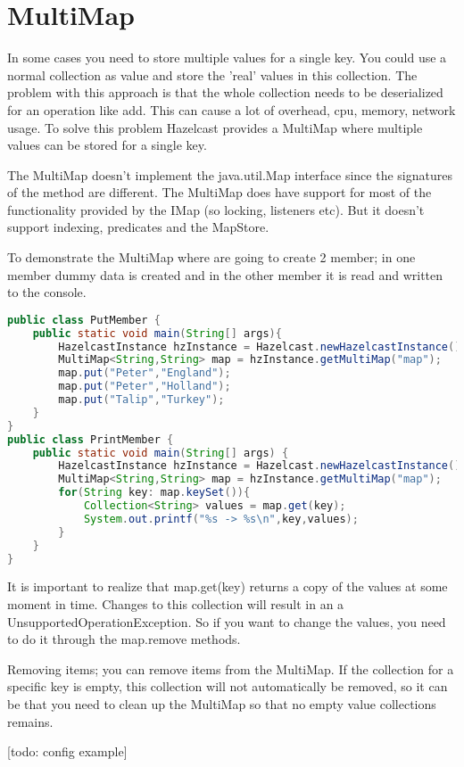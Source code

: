 \section{MultiMap}
In some cases you need to store multiple values for a single key. You could use a normal collection as value and store the 'real' values in this collection. The problem with this approach is that the whole collection needs to be deserialized for an operation like add. This can cause a lot of overhead, cpu, memory, network usage. To solve this problem Hazelcast provides a MultiMap where multiple values can be stored for a single key. 

The MultiMap doesn't implement the java.util.Map interface since the signatures of the method are different. The MultiMap does have support for most of the functionality provided by the IMap (so locking, listeners etc). But it doesn't support indexing, predicates and the MapStore.

To demonstrate the MultiMap where are going to create 2 member; in one member dummy data is created and in the other member it is read and written to the console.
\begin{lstlisting}[language=java]
public class PutMember {
    public static void main(String[] args){
        HazelcastInstance hzInstance = Hazelcast.newHazelcastInstance();
        MultiMap<String,String> map = hzInstance.getMultiMap("map");
        map.put("Peter","England");
        map.put("Peter","Holland");
        map.put("Talip","Turkey");
    }
}
public class PrintMember {
    public static void main(String[] args) {
        HazelcastInstance hzInstance = Hazelcast.newHazelcastInstance();
        MultiMap<String,String> map = hzInstance.getMultiMap("map");
        for(String key: map.keySet()){
            Collection<String> values = map.get(key);
            System.out.printf("%s -> %s\n",key,values);
        }
    }
}
\end{lstlisting}
It is important to realize that map.get(key) returns a copy of the values at some moment in time. Changes to this collection will result in an a UnsupportedOperationException. So if you want to change the values, you need to do it through the map.remove methods.

Removing items; you can remove items from the MultiMap. If the collection for a specific key is empty, this collection will not automatically be removed, so it can be that you need to clean up the MultiMap so that no empty value collections remains.

[todo: config example]

